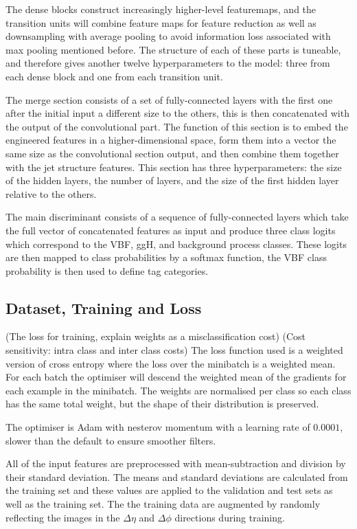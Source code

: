 The dense blocks construct increasingly higher-level featuremaps, and the transition units will combine feature maps for feature reduction as well as downsampling with average pooling to avoid information loss associated with max pooling mentioned before.  
The structure of each of these parts is tuneable, and therefore gives another twelve hyperparameters to the model: three from each dense block and one from each transition unit. 

The merge section consists of a set of fully-connected layers with the first one after the initial input a different size to the others, this is then concatenated with the output of the convolutional part.
The function of this section is to embed the engineered features in a higher-dimensional space, form them into a vector the same size as the convolutional section output, and then combine them together with the jet structure features. This section has three hyperparameters: the size of the hidden layers, the number of layers, and the size of the first hidden layer relative to the others. 


The main discriminant consists of a sequence of fully-connected layers which take the full vector of concatenated features as input and produce three class logits which correspond to the VBF, ggH, and background process classes. 
These logits are then mapped to class probabilities by a softmax function, the VBF class probability is then used to define tag categories. 

\subsection{Dataset, Training and Loss}
(The loss for training, explain weights as a misclassification cost)
(Cost sensitivity: intra class and inter class costs)
The loss function used is a weighted version of cross entropy where the loss over the minibatch is a weighted mean. For each batch the optimiser will descend the weighted mean of the gradients for each example in the minibatch. The weights are normalised per class so each class has the same total weight, but the shape of their distribution is preserved.  


The optimiser is Adam with nesterov momentum with a learning rate of $0.0001$, slower than the default to ensure smoother filters. 

All of the input features are preprocessed with mean-subtraction and division by their standard deviation. The means and standard deviations are calculated from the training set and these values are applied to the validation and test sets as well as the training set. 
The the training data are augmented by randomly reflecting the images in the $\Delta\eta$ and $\Delta\phi$ directions during training. 

